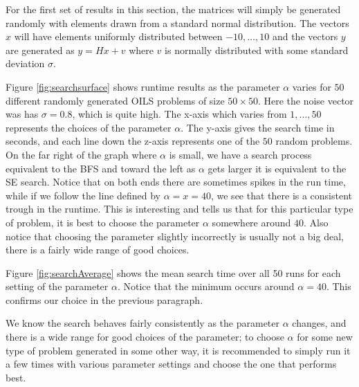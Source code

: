 \documentclass[12pt,Bold,letterpaper]{mcgilletdclass}
\begin{document}
For the first set of results in this section, the matrices will simply be generated randomly with elements drawn from a standard normal distribution. The vectors $x$ will have elements uniformly distributed between $-10 , \dots, 10$ and the vectors $y$ are generated as $y = Hx+v$ where $v$ is normally distributed with some standard deviation $\sigma$.

Figure \ref{fig:searchsurface} shows runtime results as the parameter $\alpha$ varies for $50$ different randomly generated OILS problems of size $50 \times 50$. Here the noise vector was has $\sigma = 0.8$, which is quite high. The x-axis which varies from $1 , \dots, 50$ represents the choices of the parameter $\alpha$. The y-axis gives the search time in seconds, and each line down the z-axis represents one of the $50$ random problems. On the far right of the graph where $\alpha$ is small, we have a search process equivalent to the BFS and toward the left as $\alpha$ gets larger it is equivalent to the  SE search. Notice that on both ends there are sometimes spikes in the run time, while if we follow the line defined by $\alpha = x = 40$, we see that there is a consistent trough in the runtime. This is interesting and tells us that for this particular type of problem, it is best to choose the parameter $\alpha$ somewhere around $40$. Also notice that choosing the parameter slightly incorrectly is usually not a big deal, there is a fairly wide range of good choices. 

Figure \ref{fig:searchAverage} shows the mean search time over all 50 runs for each setting of the parameter $\alpha$. Notice that the minimum occurs around $\alpha = 40$. This confirms our choice in the previous paragraph.

We know the search behaves fairly consistently as the parameter $\alpha$ changes, and there is a wide range for good choices of the parameter; to choose $\alpha$ for some new type of problem generated in some other way, it is recommended to simply run it a few times with various parameter settings and choose the one that performs best.
\end{document}
